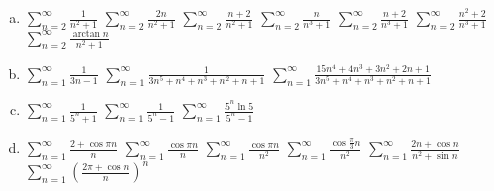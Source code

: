 \documentclass{article}
\begin{document}
\begin{enumerate}[(a)]
\item \quad 
\href{https://edward-kim-math.github.io/key/series/h1.pdf}{$\displaystyle \sum_{n=2}^\infty \frac1{n^2+1}$}
\quad
\href{https://edward-kim-math.github.io/key/series/h2.pdf}{$\displaystyle \sum_{n=2}^\infty \frac{2n}{n^2+1}$}
\quad
\href{https://edward-kim-math.github.io/key/series/h3.pdf}{$\displaystyle \sum_{n=2}^\infty \frac{n+2}{n^2+1}$}
\quad
\href{https://edward-kim-math.github.io/key/series/h4.pdf}{$\displaystyle \sum_{n=2}^\infty \frac{n}{n^3+1}$}
\quad
\href{https://edward-kim-math.github.io/key/series/h5.pdf}{$\displaystyle \sum_{n=2}^\infty \frac{n+2}{n^3+1}$}
\quad
\href{https://edward-kim-math.github.io/key/series/h6.pdf}{$\displaystyle \sum_{n=2}^\infty \frac{n^2+2}{n^3+1}$}
\quad
\href{https://edward-kim-math.github.io/key/series/h7.pdf}{$\displaystyle \sum_{n=2}^\infty \frac{\arctan n}{n^2+1}$}
\vfill

\item \quad 
\href{https://edward-kim-math.github.io/key/series/i1.pdf}{$\displaystyle \sum_{n=1}^\infty \frac1{3n-1}$}
\quad
\href{https://edward-kim-math.github.io/key/series/i2.pdf}{$\displaystyle \sum_{n=1}^\infty \frac1{3n^5+n^4+n^3+n^2+n+1}$}
\quad
\href{https://edward-kim-math.github.io/key/series/i3.pdf}{$\displaystyle \sum_{n=1}^\infty \frac{15n^4 + 4n^3 + 3n^2+2n + 1}{3n^5+n^4+n^3+n^2+n+1}$}

\vfill

\item \quad 
\href{https://edward-kim-math.github.io/key/series/j1.pdf}{$\displaystyle \sum_{n=1}^\infty \frac1{5^n+1}$}
\quad
\href{https://edward-kim-math.github.io/key/series/j2.pdf}{$\displaystyle \sum_{n=1}^\infty \frac1{5^n-1}$}
\quad
\href{https://edward-kim-math.github.io/key/series/j3.pdf}{$\displaystyle \sum_{n=1}^\infty \frac{5^n \ln 5}{5^n-1}$}


\vfill

\item \quad 
\href{https://edward-kim-math.github.io/key/series/k1.pdf}{$\displaystyle \sum_{n=1}^\infty \frac{2+\cos \pi n}n$}
\quad
\href{https://edward-kim-math.github.io/key/series/k2.pdf}{$\displaystyle \sum_{n=1}^\infty \frac{\cos \pi n}n$}
\quad
\href{https://edward-kim-math.github.io/key/series/k3.pdf}{$\displaystyle \sum_{n=1}^\infty \frac{\cos \pi n}{n^2}$}
\quad
\href{https://edward-kim-math.github.io/key/series/k4.pdf}{$\displaystyle \sum_{n=1}^\infty \frac{\cos \frac\pi3 n}{n^2}$}
\quad
\href{https://edward-kim-math.github.io/key/series/k5.pdf}{$\displaystyle \sum_{n=1}^\infty \frac{2n+\cos n}{n^2 + \sin n}$}
\quad
\href{https://edward-kim-math.github.io/key/series/k6.pdf}{$\displaystyle \sum_{n=1}^\infty \left(\frac{2\pi+\cos n}n\right)^n$}


\end{enumerate}
\end{document}
